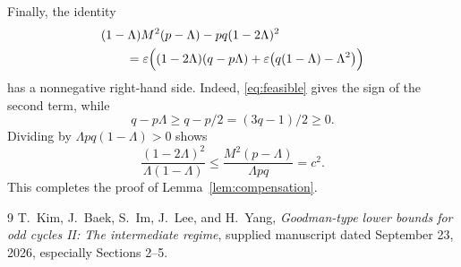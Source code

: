 \documentclass[11pt]{article}
\theoremstyle{remark}
\begin{document}
Finally, the identity
\begin{align*}
 &(1-\Lambda)M^2(p-\Lambda)-pq(1-2\Lambda)^2\\
 &\qquad=
 \varepsilon\Bigl((1-2\Lambda)(q-p\Lambda)
       +\varepsilon\bigl(q(1-\Lambda)-\Lambda^2\bigr)\Bigr)
\end{align*}
has a nonnegative right-hand side. Indeed, \eqref{eq:feasible} gives the sign of the second term, while
\[
 q-p\Lambda\ge q-p/2=(3q-1)/2\ge0.
\]
Dividing by $\Lambda pq(1-\Lambda)>0$ shows
\[
 \frac{(1-2\Lambda)^2}{\Lambda(1-\Lambda)}
 \le\frac{M^2(p-\Lambda)}{\Lambda pq}=c^2.
\]
This completes the proof of Lemma~\ref{lem:compensation}.

\begin{thebibliography}{9}
T.~Kim, J.~Baek, S.~Im, J.~Lee, and H.~Yang,
\emph{Goodman-type lower bounds for odd cycles II: The intermediate regime},
supplied manuscript dated September 23, 2026, especially Sections 2--5.
\end{thebibliography}
\end{document}
